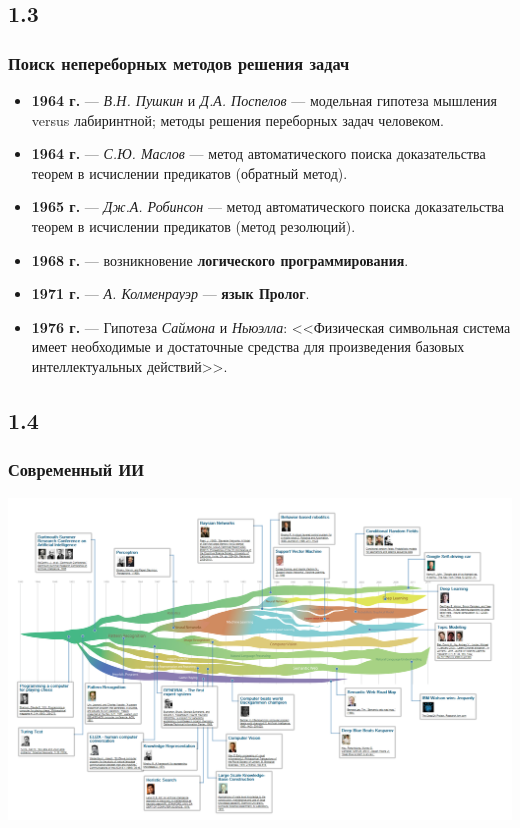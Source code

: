 \documentclass[default]{beamer}
\begin{document}
	\subsection{1.3}
	\begin{frame}
		\frametitle{Поиск непереборных методов решения задач}
		
		\begin{itemize}
			\item \textbf{1964 г.} --- \textit{В.Н. Пушкин} и \textit{Д.А. Поспелов}  --- модельная гипотеза мышления versus лабиринтной; методы решения переборных задач человеком. 
			\item \textbf{1964 г.} --- \textit{С.Ю. Маслов} --- метод автоматического поиска доказательства теорем в исчислении предикатов (обратный метод).
			\item \textbf{1965 г.} --- \textit{Дж.А. Робинсон} --- метод автоматического поиска доказательства теорем в исчислении предикатов (метод резолюций).
			\item \textbf{1968 г.} --- возникновение \textbf{логического программирования}.
			\item \textbf{1971 г.} --- \textit{А. Колменрауэр} --- \textbf{язык Пролог}.
			\item \textbf{1976 г.} --- Гипотеза \textit{Саймона} и \textit{Ньюэлла}: <<Физическая символьная система имеет необходимые и достаточные средства для произведения базовых интеллектуальных действий>>.
		\end{itemize}
	\end{frame}

	\subsection{1.4}

	\begin{frame}
		\frametitle{Современный ИИ}
		\centering
		\includegraphics[width=1.15\textwidth]{ai-1.png}
	\end{frame}
	
\end{document}
